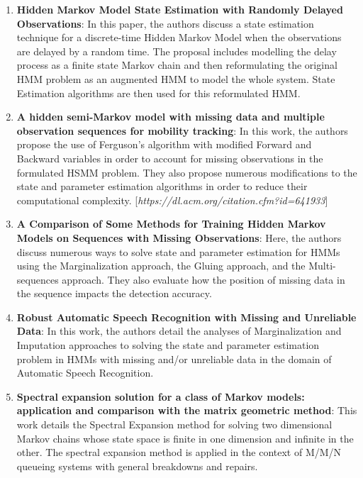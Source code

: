 \documentclass[12pt, draftcls, onecolumn]{IEEEtran}
\begin{document}
\begin{enumerate}
    \item \textbf{Hidden Markov Model State Estimation with Randomly Delayed Observations}: In this paper, the authors discuss a state estimation technique for a discrete-time Hidden Markov Model when the observations are delayed by a random time. The proposal includes modelling the delay process as a finite state Markov chain and then reformulating the original HMM problem as an augmented HMM to model the whole system. State Estimation algorithms are then used for this reformulated HMM.
    \item \textbf{A hidden semi-Markov model with missing data and multiple observation sequences for mobility tracking}: In this work, the authors propose the use of Ferguson's algorithm with modified Forward and Backward variables in order to account for missing observations in the formulated HSMM problem. They also propose numerous modifications to the state and parameter estimation algorithms in order to reduce their computational complexity.
    [\textit{https://dl.acm.org/citation.cfm?id=641933}]
    \item \textbf{A Comparison of Some Methods for Training Hidden Markov Models on Sequences with Missing Observations}: Here, the authors discuss numerous ways to solve state and parameter estimation for HMMs using the Marginalization approach, the Gluing approach, and the Multi-sequences approach. They also evaluate how the position of missing data in the sequence impacts the detection accuracy.
    \item \textbf{Robust Automatic Speech Recognition with Missing and Unreliable Data}: In this work, the authors detail the analyses of Marginalization and Imputation approaches to solving the state and parameter estimation problem in HMMs with missing and/or unreliable data in the domain of Automatic Speech Recognition.
    \item \textbf{Spectral expansion solution for a class of Markov models: application and comparison with the matrix geometric method}: This work details the Spectral Expansion method for solving two dimensional Markov chains whose state space is finite in one dimension and infinite in the other. The spectral expansion method is applied in the context of M/M/N queueing systems with general breakdowns and repairs.\newline

\end{enumerate}
\end{document}
